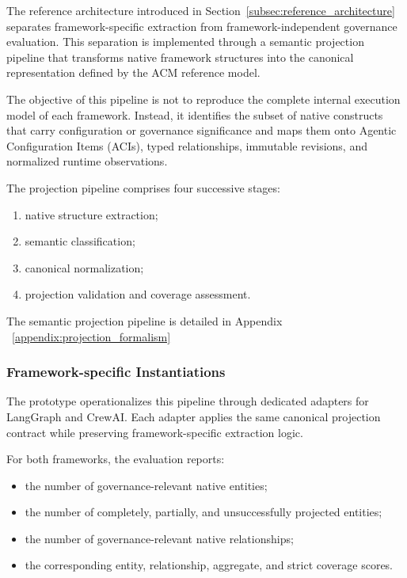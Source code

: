\documentclass[10pt]{article}
\begin{document}
The reference architecture introduced in
Section~\ref{subsec:reference_architecture} separates framework-specific
extraction from framework-independent governance evaluation. This separation is
implemented through a semantic projection pipeline that transforms native
framework structures into the canonical representation defined by the ACM
reference model.

The objective of this pipeline is not to reproduce the complete internal
execution model of each framework. Instead, it identifies the subset of native
constructs that carry configuration or governance significance and maps them
onto Agentic Configuration Items (ACIs), typed relationships, immutable
revisions, and normalized runtime observations.

The projection pipeline comprises four successive stages:

\begin{enumerate}
    \item native structure extraction;
    \item semantic classification;
    \item canonical normalization;
    \item projection validation and coverage assessment.
\end{enumerate}

The semantic projection pipeline is detailed in Appendix ~\ref{appendix:projection_formalism}


\subsubsection{Framework-specific Instantiations}

The prototype operationalizes this pipeline through dedicated adapters for
LangGraph and CrewAI. Each adapter applies the same canonical projection
contract while preserving framework-specific extraction logic.

For both frameworks, the evaluation reports:

\begin{itemize}
    \item the number of governance-relevant native entities;
    \item the number of completely, partially, and unsuccessfully projected
    entities;
    \item the number of governance-relevant native relationships;
    \item the corresponding entity, relationship, aggregate, and strict
    coverage scores.
\end{itemize}
\end{document}
